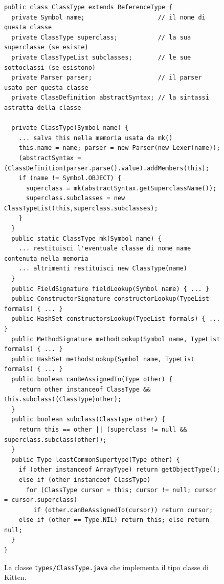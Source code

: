 \begin{figure}[t]
{\scriptsize
\begin{verbatim}
public class ClassType extends ReferenceType {
  private Symbol name;                    // il nome di questa classe
  private ClassType superclass;           // la sua superclasse (se esiste)
  private ClassTypeList subclasses;       // le sue sottoclassi (se esistono)
  private Parser parser;                  // il parser usato per questa classe
  private ClassDefinition abstractSyntax; // la sintassi astratta della classe

  private ClassType(Symbol name) {
    ... salva this nella memoria usata da mk()
    this.name = name; parser = new Parser(new Lexer(name));
    (abstractSyntax = (ClassDefinition)parser.parse().value).addMembers(this);
    if (name != Symbol.OBJECT) {
      superclass = mk(abstractSyntax.getSuperclassName());
      superclass.subclasses = new ClassTypeList(this,superclass.subclasses);
    }
  }
  public static ClassType mk(Symbol name) {
    ... restituisci l'eventuale classe di nome name contenuta nella memoria
    ... altrimenti restituisci new ClassType(name)
  }
  public FieldSignature fieldLookup(Symbol name) { ... }
  public ConstructorSignature constructorLookup(TypeList formals) { ... }
  public HashSet constructorsLookup(TypeList formals) { ... }
  public MethodSignature methodLookup(Symbol name, TypeList formals) { ... }
  public HashSet methodsLookup(Symbol name, TypeList formals) { ... }
  public boolean canBeAssignedTo(Type other) {
    return other instanceof ClassType && this.subclass((ClassType)other);
  }
  public boolean subclass(ClassType other) {
    return this == other || (superclass != null && superclass.subclass(other));
  }
  public Type leastCommonSupertype(Type other) {
    if (other instanceof ArrayType) return getObjectType();
    else if (other instanceof ClassType)
      for (ClassType cursor = this; cursor != null; cursor = cursor.superclass)
        if (other.canBeAssignedTo(cursor)) return cursor;
    else if (other == Type.NIL) return this; else return null;
  }
}
\end{verbatim}
}
\caption{La classe \texttt{types/ClassType.java} che implementa il tipo classe di Kitten.}
  \label{fig:types.ClassType}
\end{figure}

